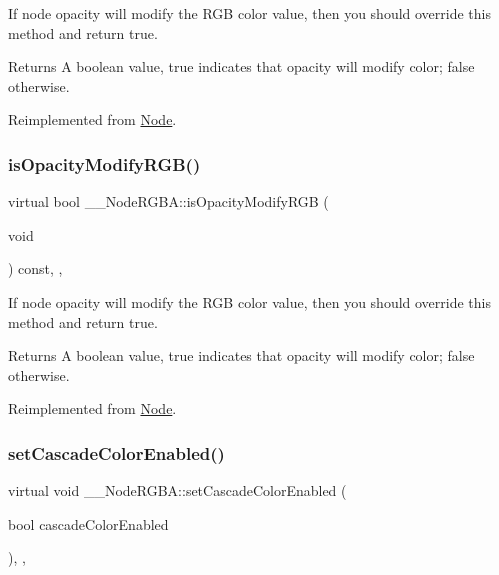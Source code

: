 If node opacity will modify the R\+GB color value, then you should override this method and return true. \begin{DoxyReturn}{Returns}
A boolean value, true indicates that opacity will modify color; false otherwise. 
\end{DoxyReturn}


Reimplemented from \hyperlink{classNode_ae6ce32d2088e2bb3426608334f1091c5}{Node}.

\mbox{\label{class____NodeRGBA_a60d28606b0a253ad511df43a868fa08c}} 
\subsubsection{\texorpdfstring{is\+Opacity\+Modify\+R\+G\+B()}{isOpacityModifyRGB()}\hspace{0.1cm}{\footnotesize\ttfamily [2/2]}}
{\footnotesize\ttfamily virtual bool \+\_\+\+\_\+\+Node\+R\+G\+B\+A\+::is\+Opacity\+Modify\+R\+GB (\begin{DoxyParamCaption}\item[{void}]{ }\end{DoxyParamCaption}) const\hspace{0.3cm}{\ttfamily [inline]}, {\ttfamily [override]}, {\ttfamily [virtual]}}

If node opacity will modify the R\+GB color value, then you should override this method and return true. \begin{DoxyReturn}{Returns}
A boolean value, true indicates that opacity will modify color; false otherwise. 
\end{DoxyReturn}


Reimplemented from \hyperlink{classNode_ae6ce32d2088e2bb3426608334f1091c5}{Node}.

\mbox{\label{class____NodeRGBA_a07c6d23e55cc2ba21115d2b93ef25bcd}} 
\subsubsection{\texorpdfstring{set\+Cascade\+Color\+Enabled()}{setCascadeColorEnabled()}\hspace{0.1cm}{\footnotesize\ttfamily [1/2]}}
{\footnotesize\ttfamily virtual void \+\_\+\+\_\+\+Node\+R\+G\+B\+A\+::set\+Cascade\+Color\+Enabled (\begin{DoxyParamCaption}\item[{bool}]{cascade\+Color\+Enabled }\end{DoxyParamCaption})\hspace{0.3cm}{\ttfamily [inline]}, {\ttfamily [override]}, {\ttfamily [virtual]}}

